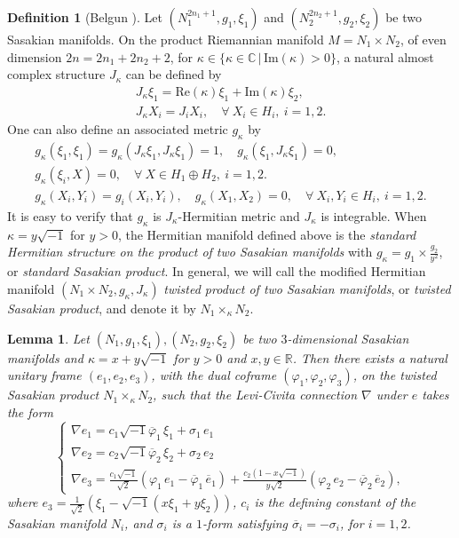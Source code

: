\documentclass{amsart}
\numberwithin{equation}{section}
\newtheorem{lemma}  [theorem]     {Lemma}
\theoremstyle{definition}
\newtheorem{definition}  [theorem]     {Definition}
\renewcommand{\1}{\mathds{1}}
\renewcommand{\>}{\rightarrow}
\begin{document}
\begin{definition}[Belgun \cite{B12}]\label{SSKproduct}
Let $(N_1^{2n_1+1}, g_1, \xi_1)$ and $(N_2^{2n_2+1}, g_2, \xi_2)$ be two Sasakian manifolds. On the product Riemannian manifold $M=N_1\times N_2$, of even dimension $2n=2n_1+2n_2+2$,
for $\kappa \in \{\kappa \in \mathbb{C} \, \big| \, \mathrm{Im} (\kappa) > 0\}$, a natural almost complex structure $J_{\kappa}$ can be defined by
\begin{gather*}
J_{\kappa}\xi_1 = \mathrm{Re}(\kappa) \xi_1 + \mathrm{Im}(\kappa)\xi_2, \\
J_{\kappa}X_i = J_i X_i, \quad \forall \ X_i \in H_i , \ i=1,2.
\end{gather*}
One can also define an associated metric $g_{\kappa}$ by
\begin{gather*}
g_{\kappa}(\xi_1,\xi_1)= g_{\kappa}(J_{\kappa}\xi_1,J_{\kappa}\xi_1)=1, \quad g_{\kappa}(\xi_1,J_{\kappa}\xi_1)=0,\\
g_{\kappa}(\xi_i,X)=0,\quad \forall \ X \in H_1 \oplus H_2, \ i=1,2.\\
g_{\kappa}(X_i,Y_i)=g_i(X_i,Y_i), \quad g_{\kappa}(X_1,X_2)=0,\quad \forall \ X_i, Y_i \in H_i,\ i=1,2.
\end{gather*}
It is easy to verify that $g_{\kappa}$ is $J_{\kappa}$-Hermitian metric and $J_{\kappa}$ is integrable.
When $\kappa=y\sqrt{-1}$ for $y>0$, the Hermitian manifold defined above is the \textit{standard Hermitian structure on the product of two Sasakian manifolds} with $g_{\kappa}=g_1 \times \frac{g_2}{y^2}$, or \textit{standard Sasakian product}.
In general, we will call the modified Hermitian manifold $(N_1\times N_2, g_{\kappa}, J_{\kappa})$ \textit{twisted product of two Sasakian manifolds}, or \textit{twisted Sasakian product},
and denote it by $N_1 \times_{\kappa} N_2$.
\end{definition}
\begin{lemma}\label{twisted}
Let $(N_1,g_1,\xi_1),(N_2,g_2,\xi_2)$ be two $3$-dimensional Sasakian manifolds
and $\kappa = x + y \sqrt{-1}$ for $y >0$ and $x,y \in\mathbb{R}$.
Then there exists a natural unitary frame $(e_1,e_2,e_3)$, with the dual coframe $(\varphi_1,\varphi_2,\varphi_3)$,
on the twisted Sasakian product $N_1 \times_{\kappa} N_2$,
such that the Levi-Civita connection $\nabla$ under $e$ takes the form
\begin{equation}\label{eq_twSSK}
\begin{cases}
\nabla e_1 = c_1\sqrt{-1} \overline{\varphi}_1\, \xi_1 + \sigma_1\, e_1 \\
\nabla e_2 = c_2\sqrt{-1} \overline{\varphi}_2\, \xi_2 + \sigma_2\, e_2 \\
\nabla e_3 = \frac{c_1\sqrt{-1}}{\sqrt{2}}(\varphi_1\, e_1 - \overline{\varphi}_1 \, \overline{e}_1)
+ \frac{c_2 (1-x\sqrt{-1})}{y\sqrt{2}} (\varphi_2\, e_2 - \overline{\varphi}_2 \, \overline{e}_2),
\end{cases}
\end{equation}
where $e_3 = \frac{1}{\sqrt{2}}(\xi_1 - \sqrt{-1}(x\xi_1 + y \xi_2))$, $c_i$ is the defining constant of the Sasakian manifold $N_i$, and $\sigma_i$ is a $1$-form satisfying $\overline{\sigma}_i = - \sigma_i$, for $i=1,2$.
\end{lemma}
\end{document}
